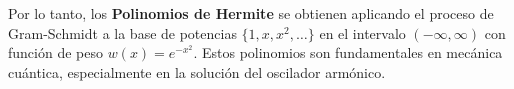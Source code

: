 \documentclass[a4paper]{article}
\begin{document}
Por lo tanto, los \textbf{Polinomios de Hermite} se obtienen aplicando el proceso de Gram-Schmidt a la base de potencias $\{1, x, x^2, \dots\}$ en el intervalo $(-\infty, \infty)$ con función de peso $w(x) = e^{-x^2}$. Estos polinomios son fundamentales en mecánica cuántica, especialmente en la solución del oscilador armónico.



 
\end{document}
